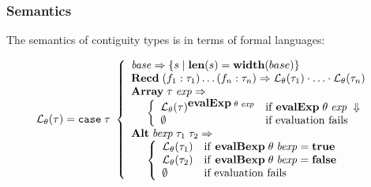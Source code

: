 \documentclass{beamer}
\newcommand{\konst}[1]{\ensuremath{\mbox{\bf{#1}}}}
\newcommand{\set}[1]{\{ {#1} \}}
\newcommand{\LangTheta}[1]{\ensuremath{{\mathcal L}_{\theta}({#1})}}
\begin{document}
\begin{frame}[fragile]\frametitle{Semantics}

The semantics of contiguity types is in terms of formal languages:

\[
\LangTheta{\tau} =
\mathtt{case}\; \tau\
 \left\{
 \begin{array}{l}
 \mathit{base} \Rightarrow \set{s \mid \konst{len}(s) = \konst{width}(base)} \\
 \konst{Recd}\; (f_1 : \tau_1) \ldots (f_n : \tau_n)
      \Rightarrow \LangTheta{\tau_1} \cdot \ldots \cdot \LangTheta{\tau_n}
\\
 \konst{Array}\; \tau \; \mathit{exp} \Rightarrow  \\
  \hspace*{5mm}
 \left\{
 \begin{array}{ll}
    \LangTheta{\tau}^{\konst{evalExp}\;\theta\;\mathit{exp}} &
       \mathrm{if}\; \konst{evalExp}\;\theta\;\mathit{exp}\;\Downarrow \\
    \emptyset & \text{if evaluation fails}
 \end{array}
 \right.
\\
 \konst{Alt}\; \mathit{bexp}\;\tau_1\; \tau_2 \Rightarrow \\
  \hspace*{5mm}
 \left\{
 \begin{array}{ll}
    \LangTheta{\tau_1} & \mathrm{if}\ \konst{evalBexp}\;\theta\;\mathit{bexp} = \konst{true} \\
    \LangTheta{\tau_2} & \mathrm{if}\ \konst{evalBexp}\;\theta\;\mathit{bexp} = \konst{false} \\
    \emptyset          & \text{if evaluation fails}
 \end{array}
 \right.
 \\
\end{array}
 \right.
\]

\end{frame}
\end{document}
